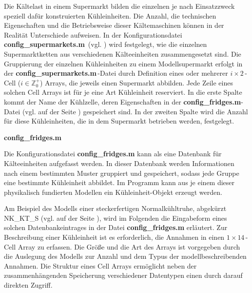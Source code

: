 Die Kältelast in einem Supermarkt bilden die einzelnen je nach Einsatzzweck
speziell dafür konstruierten K\"uhleinheiten. Die Anzahl, die technischen
Eigenschaften und die Betriebsweise dieser Kältemaschinen können in der
Realität Unterschiede aufweisen. In der Konfigurationsdatei
\textbf{config\_supermarkets.m$\,$} (vgl. ) wird festgelegt, wie
die einzelnen Supermarktketten aus verschiedenen Kälteeinheiten zusammengesetzt
sind. Die Gruppierung der einzelnen K\"uhleinheiten zu einem Modellsupermarkt
erfolgt in der \textbf{config\_supermarkets.m$\,$}-Datei durch Definition eines
oder mehrerer $i\times2\,$-Cell ($i\in \mathbb{Z}^+_0$) Arrays, die jeweils
einen Supermarkt abbilden. Jede Zeile eines solchen Cell Arrays ist für je eine
Art K\"uhleinheit reserviert. In die erste Spalte kommt der Name der
K\"uhlzelle, deren Eigenschaften in der \textbf{config\_fridges.m}-Datei (vgl.
 auf der Seite \pageref{fridge}) gespeichert sind. In der zweiten
Spalte wird die Anzahl f\"ur diese K\"uhleinheiten, die in dem Supermarkt
betrieben werden, festgelegt.

\vspace{3mm}%
\noindent\textbf{config\_fridges.m}
\vspace{3mm}

Die Konfigurationsdatei \textbf{config\_fridges.m} kann als eine Datenbank für
Kälteeinheiten aufgefasst werden. In dieser Datenbank werden Informationen nach
einem bestimmten Muster gruppiert und gespeichert, sodass jede Gruppe eine
bestimmte K\"uhleinheit abbildet. Im Programm kann aus je einem dieser
physikalisch fundierten Modellen ein K\"uhleinheit-Objekt erzeugt werden.

Am Beispiel des Modells einer steckerfertigen Normalkühltruhe, abgekürzt
NK\_KT\_S (vgl.  auf der Seite \pageref{fridge}), wird im
Folgenden die Eingabeform eines solchen Datenbankeintrages in der Datei
\textbf{config\_fridges.m} erläutert.  Zur Beschreibung einer K\"uhleinheit ist
es erforderlich, die Annahmen in einen $1\times14\,$-Cell Array zu erfassen. Die
Größe und die Art des Arrays ist vorgegeben durch die Auslegung des Modells zur
Anzahl und dem Typus der modellbeschreibenden Annahmen. Die Struktur eines Cell
Arrays ermöglicht neben der zusammenhängenden Speicherung verschiedener
Datentypen einen durch \matlab darauf direkten Zugriff.


